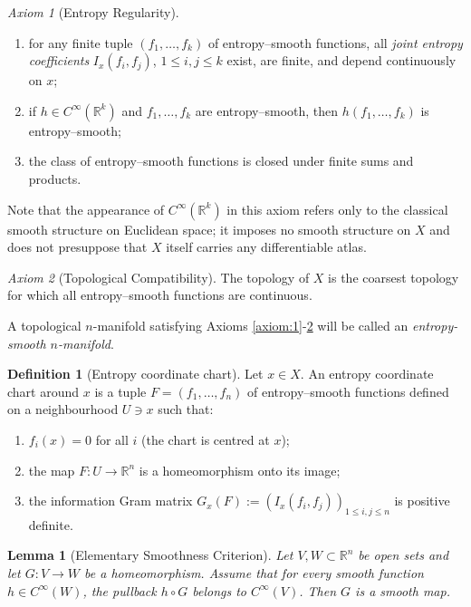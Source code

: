 \documentclass[11pt]{amsart}
\newtheorem{lemma}[theorem]{Lemma}
\theoremstyle{definition}
\newtheorem{definition}[theorem]{Definition}
\theoremstyle{remark}
\newtheorem{axiom}{Axiom}
\begin{document}
\begin{axiom}[Entropy Regularity]\label{axiom:4}
\hspace{0.5cm}
\begin{enumerate} 
\item for any finite tuple $(f_1,\dots,f_k)$ of entropy--smooth functions, all \emph{joint entropy coefficients} $I_x(f_i,f_j)$, $1\leq i,j\leq k$ exist, are finite, and depend continuously on $x$;
\item if $h\in C^\infty(\mathbb{R}^k)$ and $f_1,\dots,f_k$ are entropy--smooth, then $h(f_1,\dots,f_k)$ is entropy--smooth;
\item the class of entropy--smooth functions is closed under finite sums and products.
\end{enumerate}
\end{axiom}
Note that the appearance of $C^\infty(\mathbb{R}^k)$ in this axiom refers only
to the classical smooth structure on Euclidean space; it imposes no smooth
structure on $X$ and does not presuppose that $X$ itself carries any
differentiable atlas.

\begin{axiom}[Topological Compatibility]
\label{axiom:5}
The topology of $X$ is the coarsest topology for which all entropy--smooth functions are continuous.
\end{axiom}

A topological $n$-manifold satisfying Axioms \ref{axiom:1}-\ref{axiom:5} will be called an \emph{entropy-smooth $n$-manifold}.

\begin{definition}[Entropy coordinate chart]\label{definition:entropy_chart}
Let $x\in X$. An entropy coordinate chart around $x$ is a tuple
$F=(f_1,\dots,f_n)$ of entropy–smooth functions defined on a neighbourhood
$U\ni x$ such that:

\begin{enumerate}
\item $f_i(x)=0$ for all $i$ (the chart is centred at $x$);

\item the map $F:U\to\mathbb{R}^n$ is a homeomorphism onto its image;

\item the information Gram matrix
      $G_x(F):=(I_x(f_i,f_j))_{1\le i,j\le n}$ is positive definite.
\end{enumerate}
\end{definition}

\begin{lemma}[Elementary Smoothness Criterion]
\label{lem:elementary-smoothness}
Let $V,W\subset\mathbb{R}^n$ be open sets and let $G:V\to W$ be a homeomorphism.
Assume that for every smooth function $h\in C^\infty(W)$, the pullback
$h\circ G$ belongs to $C^\infty(V)$. Then $G$ is a smooth map.
\end{lemma}
\end{document}
